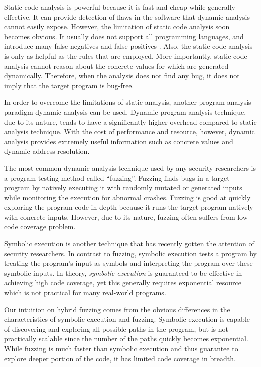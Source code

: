 \documentclass[a4paper, 11pt]{article}
\begin{document}
Static code analysis is powerful because it is fast and cheap while generally effective. It can provide detection of flaws in the software that dynamic analysis cannot easily expose. However, the limitation of static code analysis soon becomes obvious. It usually does not support all programming languages, and introduce many false negatives and false positives \cite{hybridthesis}. Also, the static code analysis is only as helpful as the rules that are employed. More
importantly, static code analysis cannot reason about the concrete values for which are generated dynamically. Therefore, when the analysis does not find any bug, it does not imply that the target program is bug-free.

In order to overcome the limitations of static analysis, another program analysis paradigm dynamic analysis can be used. Dynamic program analysis technique, due to its nature, tends to have a significantly higher overhead compared to static analysis technique. With the cost of performance and resource, however, dynamic analysis provides extremely useful information such as concrete values and dynamic address resolution.

The most common dynamic analysis technique used by any security researchers is a program testing method called ``fuzzing''. Fuzzing finds bugs in a target program by natively executing it with randomly mutated or generated inputs while monitoring the execution for abnormal crashes. Fuzzing is good at quickly exploring the program code in depth because it runs the target program natively with concrete inputs. However, due to its nature, fuzzing often suffers from low code coverage problem.

Symbolic execution is another technique that has recently gotten the attention of security researchers. In contrast to fuzzing, symbolic execution tests a program by treating the program’s input as symbols
and interpreting the program over these symbolic inputs. In theory, \emph{symbolic execution} is guaranteed to be effective in achieving high code coverage, yet this generally requires exponential resource which is not practical for many real-world programs.

Our intuition on hybrid fuzzing comes from the obvious differences in the characteristics of symbolic execution and fuzzing. Symbolic execution is capable of discovering and exploring all possible paths in the program, but is not practically scalable since the number of the paths quickly becomes exponential. While fuzzing is much faster than symbolic execution and thus guarantee to explore deeper portion of the code, it has limited code coverage in breadth.
\end{document}
